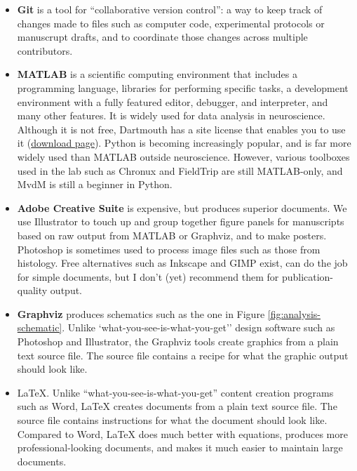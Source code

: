 \documentclass{tufte-book}
\begin{document}
\begin{itemize}
\item{{\bf Git} is a tool for ``collaborative version control'': a way
  to keep track of changes made to files such as computer code,
  experimental protocols or manuscrupt drafts, and to coordinate those
  changes across multiple contributors.}
\item{{\bf MATLAB} is a scientific computing environment that includes
  a programming language, libraries for performing specific tasks, a
  development environment with a fully featured editor, debugger, and
  interpreter, and many other features. It is widely used for data
  analysis in neuroscience. Although it is not free, Dartmouth has a
  site license that enables you to use it
  (\href{http://caligari.dartmouth.edu/downloads/matlab}{download
    page}). Python is becoming increasingly popular, and is far more
  widely used than MATLAB outside neuroscience. However, various
  toolboxes used in the lab such as Chronux and FieldTrip are still
  MATLAB-only, and MvdM is still a beginner in Python.}
\item{{\bf Adobe Creative Suite} is expensive, but produces superior
  documents. We use Illustrator to touch up and group together figure
  panels for manuscripts based on raw output from MATLAB or Graphviz,
  and to make posters. Photoshop is sometimes used to process image
  files such as those from histology. Free alternatives such as
  Inkscape and GIMP exist, can do the job for simple documents, but I
  don't (yet) recommend them for publication-quality output.}
\item{{\bf Graphviz} produces schematics such as the one in Figure
  \ref{fig:analysis-schematic}. Unlike
  `what-you-see-is-what-you-get'' design software such as Photoshop
  and Illustrator, the Graphviz tools create graphics from a plain
  text source file. The source file contains a recipe for what the
  graphic output should look like.}
\item{\LaTeX. Unlike ``what-you-see-is-what-you-get'' content creation
  programs such as Word, LaTeX creates documents from a plain text
  source file. The source file contains instructions for what the
  document should look like. Compared to Word, LaTeX does much better
  with equations, produces more professional-looking
  documents, and makes it much
  easier to maintain large documents.}
\end{itemize}
\end{document}
